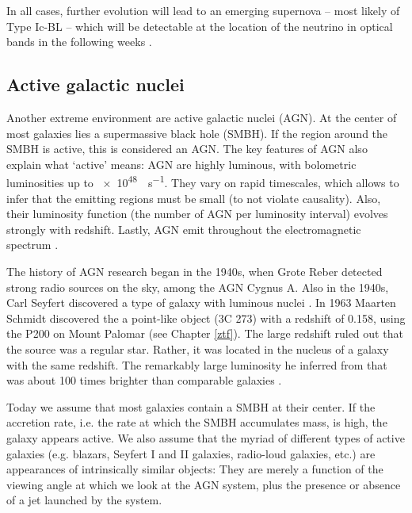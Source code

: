 \documentclass[
    a4paper, %
    fontsize=10pt, %
    twoside=false, %
    numbers=noenddot, %
    fontmethod=tex,
]{kaobook}
\begin{document}
In all cases, further evolution will lead to an emerging supernova -- most likely of Type Ic-BL -- which will be detectable at the location of the neutrino in optical bands in the following weeks .

\subsection{Active galactic nuclei} \label{agn}
Another extreme environment are active galactic nuclei (AGN). At the center of most galaxies lies a supermassive black hole (SMBH). If the region around the SMBH is active, this is considered an AGN. The key features of AGN also explain what `active' means: AGN are highly luminous, with bolometric luminosities up to \SI{e48}{\erg\per\s}. They vary on rapid timescales, which allows to infer that the emitting regions must be small (to not violate causality). Also, their luminosity function (the number of AGN per luminosity interval) evolves strongly with redshift. Lastly, AGN emit throughout the electromagnetic spectrum .

The history of AGN research began in the 1940s, when Grote Reber detected strong radio sources on the sky, among the AGN Cygnus A. Also in the 1940s, Carl Seyfert discovered a type of galaxy with luminous nuclei . In 1963 Maarten Schmidt discovered the a point-like object (3C 273) with a redshift of 0.158, using the P200 on Mount Palomar (see Chapter \ref{ztf}). The large redshift ruled out that the source was a regular star. Rather, it was located in the nucleus of a galaxy with the same redshift. The remarkably large luminosity he inferred from that was about 100 times brighter than comparable galaxies .

Today we assume that most galaxies contain a SMBH at their center. If the accretion rate, i.e. the rate at which the SMBH accumulates mass, is high, the galaxy appears active. We also assume that the myriad of different types of active galaxies (e.g. blazars, Seyfert I and II galaxies, radio-loud galaxies, etc.) are appearances of intrinsically similar objects: They are merely a function of the viewing angle at which we look at the AGN system, plus the presence or absence of a jet launched by the system.
\end{document}
